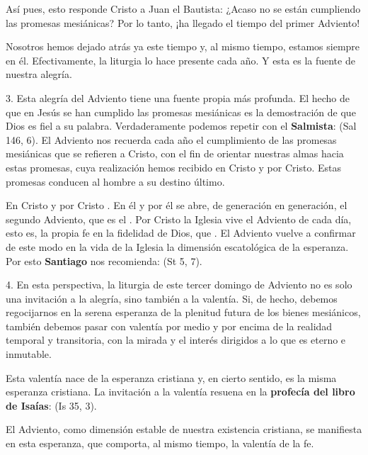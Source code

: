 Así pues, esto responde Cristo a Juan el Bautista: ¿Acaso no se están cumpliendo las promesas mesiánicas? Por lo tanto, ¡ha llegado el tiempo del primer Adviento!

Nosotros hemos dejado atrás ya este tiempo y, al mismo tiempo, estamos siempre en él. Efectivamente, la liturgia lo hace presente cada año. Y esta es la fuente de nuestra alegría.

3. Esta alegría del Adviento tiene una fuente propia más profunda. El hecho de que en Jesús se han cumplido las promesas mesiánicas es la demostración de que Dios es fiel a su palabra. Verdaderamente podemos repetir con el \textbf{Salmista}:  (Sal 146, 6). El Adviento nos recuerda cada año el cumplimiento de las promesas mesiánicas que se refieren a Cristo, con el fin de orientar nuestras almas hacia estas promesas, cuya realización hemos recibido en Cristo y por Cristo. Estas promesas conducen al hombre a su destino último.

En Cristo y por Cristo . En él y por él se abre, de generación en generación, el segundo Adviento, que es el . Por Cristo la Iglesia vive el Adviento de cada día, esto es, la propia fe en la fidelidad de Dios, que . El Adviento vuelve a confirmar de este modo en la vida de la Iglesia la dimensión escatológica de la esperanza. Por esto \textbf{Santiago} nos recomienda:  (St 5, 7).

4. En esta perspectiva, la liturgia de este tercer domingo de Adviento no es solo una invitación a la alegría, sino también a la valentía. Si, de hecho, debemos regocijarnos en la serena esperanza de la plenitud futura de los bienes mesiánicos, también debemos pasar con valentía por medio y por encima de la realidad temporal y transitoria, con la mirada y el interés dirigidos a lo que es eterno e inmutable.

Esta valentía nace de la esperanza cristiana y, en cierto sentido, es la misma esperanza cristiana. La invitación a la valentía resuena en la \textbf{profecía del libro de Isaías}:  (Is 35, 3).

El Adviento, como dimensión estable de nuestra existencia cristiana, se manifiesta en esta esperanza, que comporta, al mismo tiempo, la valentía  de la fe.

